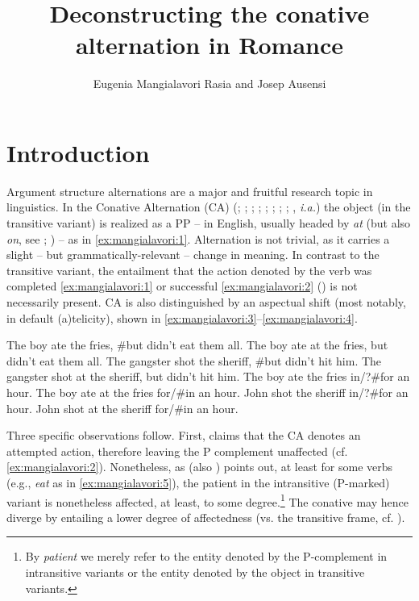 \documentclass[output=paper,colorlinks,citecolor=brown,
]{langscibook}
\author{Eugenia Mangialavori Rasia\affiliation{National Scientific and Technical Research Council (CONICET)} and Josep Ausensi\affiliation{Universitat Pompeu Fabra}}
\title{Deconstructing the conative alternation in Romance}
\begin{document}
\maketitle

\section{Introduction}\label{sec:mangialavori:1}
Argument structure alternations are a major and fruitful research topic in linguistics. In the Conative Alternation (CA) (\citealt{Guersseletal1985}; \citealt{Laughren1988}; \citealt{Pinker1989}; \citealt{Levin1993}; \citealt{Goldberg1995}; \citealt{vanderLeek1996}; \citealt{Croft1998}; \citealt{Broccias2003}; \citealt{Beavers2006}, \textit{i.a.}) the object (in the transitive variant) is realized as a PP -- in English, usually headed by \textit{at} (but also \textit{on}, see \citealt{Levin1993}; \citealt{Beavers2006}) -- as in  \ref{ex:mangialavori:1}. Alternation is not trivial, as it carries a slight -- but grammatically-relevant -- change in meaning. In contrast to the transitive variant, the entailment that the action denoted by the verb was completed  \ref{ex:mangialavori:1} or successful  \ref{ex:mangialavori:2} (\citealt{Levin1993}) is not necessarily present. CA is also distinguished by an aspectual shift (most notably, in default (a)telicity), shown in  \ref{ex:mangialavori:3}--\ref{ex:mangialavori:4}.

\ea\label{ex:mangialavori:1}
  \ea The boy ate the fries, \#but didn’t eat them all.
  \ex The boy ate at the fries, but didn’t eat them all.
  \z 
\z 
\ea\label{ex:mangialavori:2}
  \ea The gangster shot the sheriff, \#but didn’t hit him.
  \ex The gangster shot at the sheriff, but didn’t hit him.
  \z 
\z 
\ea\label{ex:mangialavori:3}
  \ea The boy ate the fries in/?\#for an hour.
  \ex The boy ate at the fries for/\#in an hour.
  \z 
\z 
\ea\label{ex:mangialavori:4}
  \ea John shot the sheriff in/?\#for an hour.
  \ex John shot at the sheriff for/\#in an hour.
  \z 
\z 

Three specific observations follow. First, \citet{Levin1993} claims that the CA denotes an attempted action, therefore leaving the P complement unaffected (cf.  \ref{ex:mangialavori:2}). Nonetheless, as \citet{Broccias2003} (also \citealt{Beavers2006}) points out, at least for some verbs (e.g., \textit{eat} as in  \ref{ex:mangialavori:5}), the patient in the intransitive (P-marked) variant is nonetheless affected, at least, to some degree.\footnote{By \textit{patient} we merely refer to the entity denoted by the P-complement in intransitive variants or the entity denoted by the object in transitive variants.} The conative may hence diverge by entailing a lower degree of affectedness (vs. the transitive frame, cf. \citealt{Beavers2011,Beavers2013}).
\end{document}
